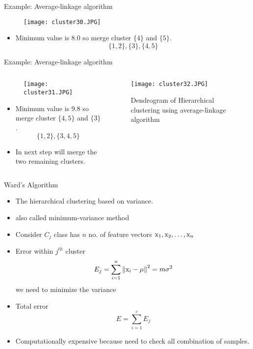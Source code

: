 \begin{frame}{Example: Average-linkage algorithm}
\begin{figure}
\texttt{[image: cluster30.JPG]}
\end{figure}
\begin{itemize}
\item Minimum value is 8.0 so merge cluster $\{4\}$ and $\{5\}$.
\begin{equation}
\{1,2\},\{3\},\{4,5\}\nonumber
\end{equation}
\end{itemize}
\end{frame}

\begin{frame}{Example: Average-linkage algorithm}
\begin{columns}
\begin{column}{5cm}
\begin{figure}
\texttt{[image: cluster31.JPG]}
\end{figure}
\begin{itemize}
\item Minimum value is 9.8 so merge cluster $\{4,5\}$ and $\{3\}$.
\begin{equation}
\{1,2\},\{3,4,5\}\nonumber
\end{equation}
\item In next step will merge the two remaining clusters.
\end{itemize}
\end{column}
\begin{column}{5.5cm}
\begin{figure}
\texttt{[image: cluster32.JPG]}
\caption{Dendrogram of Hierarchical clustering using average-linkage algorithm}
\end{figure}
\end{column}
\end{columns}
\end{frame}


\begin{frame}{Ward's Algorithm}
\begin{itemize}
\item The hierarchical clustering based on variance.
\item also called minimum-variance method
\item Consider $C_j$ class has $n$ no. of feature vectors ${\rm x}_1,{\rm x}_2,\ldots,{\rm x}_n$
\item Error within $j^{th}$ cluster
\begin{equation}
{E_j} = \sum\limits_{i = 1}^n {{{\left\| {{{\rm x}_i} - \mu } \right\|}^2} = m{\sigma ^2}} \nonumber
\end{equation}
we need to minimize the variance
\item Total error
\begin{equation}
E=\sum\limits_{i = 1}^c E_j \nonumber
\end{equation}
\item Computationally expensive because need to check all combination of samples.
\end{itemize}
\end{frame}

